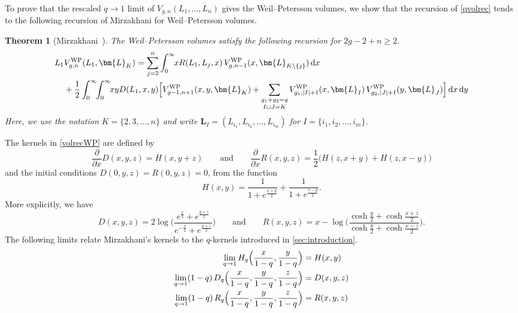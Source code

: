\documentclass[a4paper]{article}
\theoremstyle{plain}
\newtheorem{theorem}{Theorem}
\theoremstyle{definition}
\newcommand{\dd}{\mathrm{d}}
\renewcommand{\geq}{\geqslant}
\newcommand{\LL}{\bm{L}}
\begin{document}
To prove that the rescaled $q \to 1$ limit of $V_{g,n}(L_1, \ldots, L_n)$ gives the Weil--Petersson volumes, we show that the recursion of \cref{qvolrec} tends to the following recursion of Mirzakhani for Weil--Petersson volumes.


\begin{theorem}[Mirzakhani~\cite{MirSim}] \label{th:mirzvolrec}
The Weil--Petersson volumes satisfy the following recursion for $2g-2+n \geq 2$.
\begin{align}
L_1&V^{\mathrm{WP}}_{g,n}(L_1, \LL_K) = \sum_{j=2}^n\int_0^\infty \!\! xR(L_1,L_j,x) \, V^{\mathrm{WP}}_{g,n-1}(x, \LL_{K \setminus \{j\}}) \, \dd x \notag \\
&+\frac{1}{2}\int_0^\infty \!\! \int_0^\infty \!\! xyD(L_1,x,y) \Big[ V^{\mathrm{WP}}_{g-1,n+1}(x,y, \LL_K) + \mathop{\sum_{g_1+g_2=g}}_{I \sqcup J = K} V^{\mathrm{WP}}_{g_1,|I|+1}(x, \LL_I) \, V^{\mathrm{WP}}_{g_2,|J|+1}(y, \LL_J) \Big] \, \dd x \, \dd y \label{volrecWP}
\end{align}
Here, we use the notation $K = \{2, 3, \ldots, n\}$ and write $\LL_I = (L_{i_1}, L_{i_2}, \ldots, L_{i_m})$ for $I = \{i_1, i_2, \ldots, i_m\}$.
\end{theorem}


The kernels in \cref{volrecWP} are defined by
\[
\frac{\partial}{\partial x}D(x,y,z)=H(x,y+z) \qquad \text{and} \qquad \frac{\partial}{\partial x}R(x,y,z) = \frac{1}{2} \big( H(z,x+y)+H(z,x-y) \big)
\]
and the initial conditions $D(0,y,z)=R(0,y,z)=0$, from the function
\[
H(x,y)=\frac{1}{1+e^{\frac{x+y}{2}}}+\frac{1}{1+e^{\frac{x-y}{2}}}.
\]
More explicitly, we have
\[
D(x,y,z) = 2\log \bigg( \frac{e^{\frac{x}{2}}+e^{\frac{y+z}{2}}}{e^{-\frac{x}{2}}+e^{\frac{y+z}{2}}} \bigg) \qquad \text{and} \qquad R(x,y,z) = x - \log \bigg( \frac{\cosh\frac{y}{2}+\cosh\frac{x+z}{2}}{\cosh\frac{y}{2}+\cosh\frac{x-z}{2}} \bigg).
\]
The following limits relate Mirzakhani's kernels to the $q$-kernels introduced in \cref{sec:introduction}.
\begin{align} \label{qkerlim}
\lim_{q\to 1} H_q \Big( \frac{x}{1-q}, \frac{y}{1-q} \Big) &= H(x,y) \notag \\
\lim_{q\to 1} (1-q) \, D_q \Big( \frac{x}{1-q}, \frac{y}{1-q}, \frac{z}{1-q} \Big) &= D(x,y,z) \\
\lim_{q\to 1} (1-q) \, R_q \Big( \frac{x}{1-q}, \frac{y}{1-q}, \frac{z}{1-q} \Big) &= R(x,y,z) \notag
\end{align}
\end{document}
